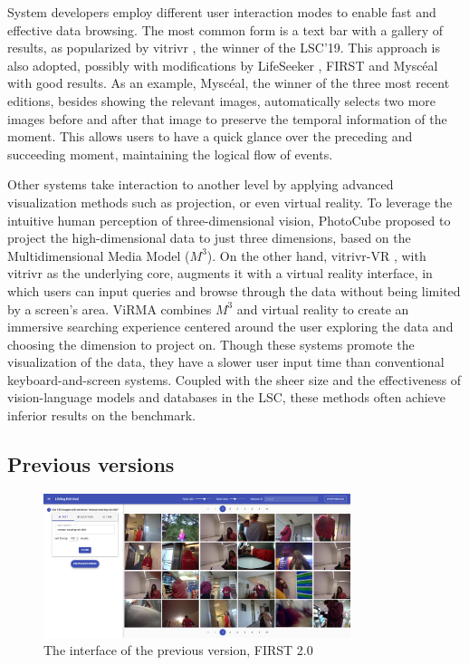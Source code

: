 System developers employ different user interaction modes to enable fast and effective data browsing. The most common form is a text bar with a gallery of results, as popularized by vitrivr \cite{heller_vitrivr_2022}, the winner of the LSC'19. This approach is also adopted, possibly with modifications by LifeSeeker \cite{nguyen_lifeseeker_2022}, FIRST  and Myscéal \cite{tran_e-mysce_2022} with good results. As an example, Myscéal, the winner of the three most recent editions, besides showing the relevant images, automatically selects two more images before and after that image to preserve the temporal information of the moment. This allows users to have a quick glance over the preceding and succeeding moment, maintaining the logical flow of events. 

Other systems take interaction to another level by applying advanced visualization methods such as projection, or even virtual reality. To leverage the intuitive human perception of three-dimensional vision, PhotoCube \cite{shin_photocube_2021} proposed to project the high-dimensional data to just three dimensions, based on the Multidimensional Media Model ($M^3$). On the other hand, vitrivr-VR \cite{spiess_multimodal_2022}, with vitrivr \cite{heller_vitrivr_2022} as the underlying core, augments it with a virtual reality interface, in which users can input queries and browse through the data without being limited by a screen's area. ViRMA \cite{duane_virma_2021} combines $M^3$ and virtual reality to create an immersive searching experience centered around the user exploring the data and choosing the dimension to project on. Though these systems promote the visualization of the data, they have a slower user input time than conventional keyboard-and-screen systems. Coupled with the sheer size and the effectiveness of vision-language models and databases in the LSC, these methods often achieve inferior results on the benchmark.

\subsection{Previous versions}
\label{sec:previous_versions}

\begin{figure}
    \centering
    \includegraphics[width=0.8\textwidth]{content/resources/images/FIRST2.png}
    \caption{The interface of the previous version, FIRST 2.0 \cite{trang-trung_flexible_2021}}
    \label{fig:first2}
\end{figure}

